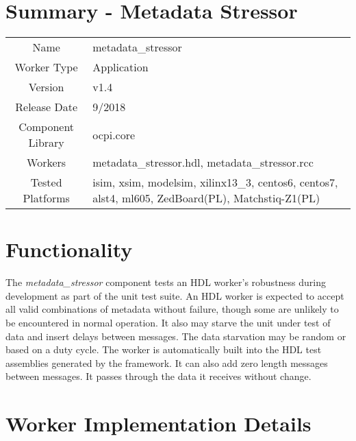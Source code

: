 \documentclass{article}
\author{} %
\date{Version \docVersion} %
\title{\docTitle}
\def\docVersion{1.4}
\def\comp{metadata\_stressor}
\def\Comp{Metadata Stressor}
\begin{document}
\section*{Summary - \Comp}
\begin{tabular}{|c|M{13.5cm}|}
	\hline
	                  &  \\
	\hline
	Name              & \comp  \\
	\hline
	Worker Type       & Application  \\
	\hline
	Version           &  v\docVersion  \\
	\hline
	Release Date      &  9/2018  \\
	\hline
	Component Library &  ocpi.core  \\
	\hline
	Workers           &  \comp.hdl, \comp.rcc  \\
	\hline
	Tested Platforms  &  isim, xsim, modelsim, xilinx13\_3, centos6, centos7, alst4, ml605, ZedBoard(PL), Matchstiq-Z1(PL)  \\
	\hline
\end{tabular}

\section*{Functionality}
\begin{flushleft}
The \textit{\comp} component tests an HDL worker's robustness during development as part of the unit test suite. An HDL worker is expected to accept all valid combinations of metadata without failure, though some are unlikely to be encountered in normal operation. It also may starve the unit under test of data and insert delays between messages. The data starvation may be random or based on a duty cycle. The worker is automatically built into the HDL test assemblies generated by the framework. It can also add zero length messages between messages. It passes through the data it receives without change.  \medskip
\end{flushleft}


\section*{Worker Implementation Details}
\end{document}
